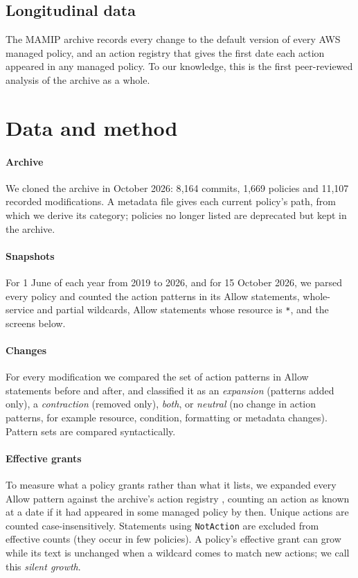 \documentclass[journal]{IEEEtran}
\begin{document}
\subsection{Longitudinal data}
The MAMIP archive \cite{mamip} records every change to the default version of every AWS managed policy, and an action registry that gives
the first date each action appeared in any managed policy. To our knowledge, this is the first peer-reviewed analysis of the archive as
a whole.

\section{Data and method}
\label{sec:method}
\paragraph*{Archive} We cloned the archive in October 2026: 8{,}164 commits, 1{,}669 policies and 11{,}107 recorded modifications. A
metadata file gives each current policy's path, from which we derive its category; policies no longer listed are deprecated but kept
in the archive.

\paragraph*{Snapshots} For 1 June of each year from 2019 to 2026, and for 15 October 2026, we parsed every policy and counted the
action patterns in its Allow statements, whole-service and partial wildcards, Allow statements whose resource is \texttt{*}, and the
screens below.

\paragraph*{Changes} For every modification we compared the set of action patterns in Allow statements before and after, and classified
it as an \emph{expansion} (patterns added only), a \emph{contraction} (removed only), \emph{both}, or \emph{neutral} (no change in action
patterns, for example resource, condition, formatting or metadata changes). Pattern sets are compared syntactically.

\paragraph*{Effective grants} To measure what a policy grants rather than what it lists, we expanded every Allow pattern against the
archive's action registry \cite{mamip}, counting an action as known at a date if it had appeared in some managed policy by then. Unique
actions are counted case-insensitively. Statements using \texttt{NotAction} are excluded from effective counts (they occur in few
policies). A policy's effective grant can grow while its text is unchanged when a wildcard comes to match new actions; we call this
\emph{silent growth}.
\end{document}
